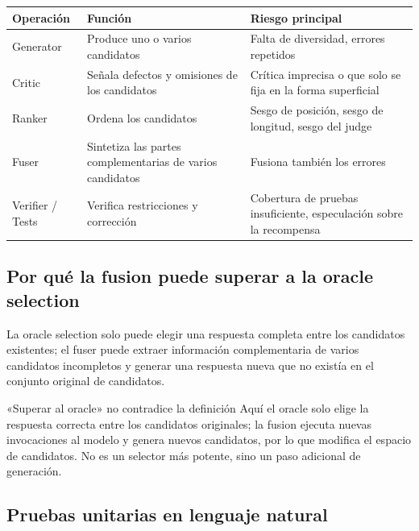 \documentclass[a4paper]{article}
\begin{document}
\begin{table}[H]
\centering
\small
\begin{tabular}{p{2.8cm}p{5.1cm}p{5.7cm}}
\toprule
\textbf{Operación} & \textbf{Función} & \textbf{Riesgo principal} \\
\midrule
Generator & Produce uno o varios candidatos & Falta de diversidad, errores repetidos \\
Critic & Señala defectos y omisiones de los candidatos & Crítica imprecisa o que solo se fija en la forma superficial \\
Ranker & Ordena los candidatos & Sesgo de posición, sesgo de longitud, sesgo del judge \\
Fuser & Sintetiza las partes complementarias de varios candidatos & Fusiona también los errores \\
Verifier / Tests & Verifica restricciones y corrección & Cobertura de pruebas insuficiente, especulación sobre la recompensa \\
\bottomrule
\end{tabular}
\end{table}

\subsection{Por qué la fusion puede superar a la oracle selection}

La oracle selection solo puede elegir una respuesta completa entre los candidatos existentes; el fuser puede extraer información complementaria de varios candidatos incompletos y generar una respuesta nueva que no existía en el conjunto original de candidatos.


\begin{warningbox}{«Superar al oracle» no contradice la definición}
Aquí el oracle solo elige la respuesta correcta entre los candidatos originales; la fusion ejecuta nuevas invocaciones al modelo y genera nuevos candidatos, por lo que modifica el espacio de candidatos. No es un selector más potente, sino un paso adicional de generación.
\end{warningbox}

\subsection{Pruebas unitarias en lenguaje natural}
\end{document}
